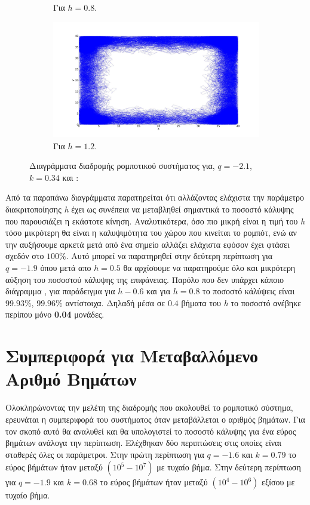 \begin{figure}[ht]
\begin{subfigure}[b]{0.55\textwidth}
	\caption{Για $h =0.8$.}
	\label{f:g106}
\end{subfigure}
\hfill
\begin{subfigure}[b]{0.55\textwidth}
	\centering
	\includegraphics[width=\textwidth]{LateX images/log/h/g4-2.1}
	\caption{Για $h =1.2$.}
	\label{f:g107}
\end{subfigure}
\hfill
\caption{Διαγράμματα διαδρομής ρομποτικού συστήματος για, $q = -2.1$, $k = 0.34$ και :}
\end{figure}

Από τα παραπάνω διαγράμματα παρατηρείται ότι αλλάζοντας ελάχιστα την παράμετρο διακριτοποίησης \emph{h} έχει ως συνέπεια να μεταβληθεί σημαντικά το ποσοστό κάλυψης που παρουσιάζει η εκάστοτε κίνηση. Αναλυτικότερα, όσο πιο μικρή είναι η τιμή του \emph{h} τόσο μικρότερη θα είναι η καλυψιμότητα του χώρου που κινείται το ρομπότ, ενώ αν την αυξήσουμε αρκετά μετά από ένα σημείο αλλάζει ελάχιστα εφόσον έχει φτάσει σχεδόν στο $100\%$. Αυτό μπορεί να παρατηρηθεί στην δεύτερη περίπτωση για $q = -1.9$ όπου μετά απο $h = 0.5$ θα αρχίσουμε να παρατηρούμε όλο και μικρότερη αύξηση του ποσοστού κάλυψης της επιφάνειας. Παρόλο που δεν υπάρχει κάποιο διάγραμμα , για παράδειγμα για $h - 0.6$ και για $h = 0.8$ το ποσοστό κάλύψεις είναι $99.93\%$,  $99.96\%$ αντίστοιχα. Δηλαδή μέσα σε $0.4$ βήματα του \emph{h} το ποσοστό ανέβηκε περίπου μόνο \textbf{0.04} μονάδες.

\clearpage

\section{Συμπεριφορά για Μεταβαλλόμενο Αριθμό Βημάτων}
\label{sec:g5}
Ολοκληρώνοντας την μελέτη της διαδρομής που ακολουθεί το ρομποτικό
σύστημα, ερευνάται η συμπεριφορά του συστήματος όταν μεταβάλλεται ο αριθμός βημάτων. Για τον σκοπό αυτό θα αναλυθεί και θα υπολογιστεί το ποσοστό κάλυψης για ένα εύρος βημάτων ανάλογα την περίπτωση. Ελέχθηκαν δύο περιπτώσεις στις οποίες είναι σταθερές όλες οι παράμετροι. Στην πρώτη περίπτωση για $q = -1.6$ και $k = 0.79$ το εύρος βήμάτων ήταν μεταξύ $(10^5-10^7)$ με τυχαίο βήμα.
Στην δεύτερη περίπτωση για $q = -1.9$ και $k = 0.68$ το εύρος βήμάτων ήταν μεταξύ $(10^4-10^6)$ εξίσου με τυχαίο βήμα.

